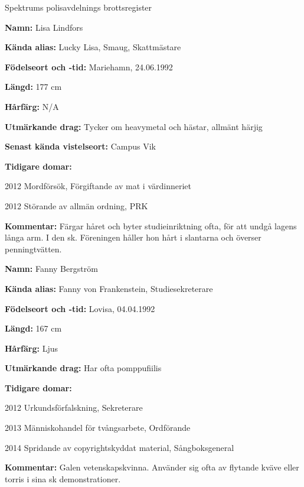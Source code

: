 \documentclass{spektraklet}
\begin{document}
\begin{artikel}{Spektrums polisavdelnings
brottsregister}{}
\begin{twocolumns}


\textbf{Namn:} Lisa Lindfors

\textbf{Kända alias:} Lucky Lisa, Smaug, Skattmästare

\textbf{Födelseort och -tid:} Mariehamn, 24.06.1992

\textbf{Längd:} 177 cm

\textbf{Hårfärg:} N/A

\textbf{Utmärkande drag:} Tycker om heavymetal och hästar, allmänt härjig

\textbf{Senast kända vistelseort:} Campus Vik

\textbf{Tidigare domar:}

		2012	Mordförsök, Förgiftande av mat i värdinneriet
		
		2012 	Störande av allmän ordning, PRK	

\textbf{Kommentar:} Färgar håret och byter studieinriktning ofta, för att undgå lagens långa arm. I den sk. Föreningen håller hon hårt i slantarna och överser penningtvätten.




\textbf{Namn:} Fanny Bergström

\textbf{Kända alias:} Fanny von Frankenstein, Studiesekreterare

\textbf{Födelseort och -tid:} Lovisa, 04.04.1992

\textbf{Längd:} 167 cm

\textbf{Hårfärg:} Ljus

\textbf{Utmärkande drag:} Har ofta pomppufiilis

\textbf{Tidigare domar:}

		2012	Urkundsförfalskning, Sekreterare
		
		2013	Människohandel för tvångsarbete, Ordförande
		
		2014	Spridande av copyrightskyddat material, Sångboksgeneral

\textbf{Kommentar:} Galen vetenskapskvinna. Använder sig ofta av flytande kväve eller torris i sina sk demonstrationer.



\newpage





\end{twocolumns}
\end{artikel}
\end{document}
